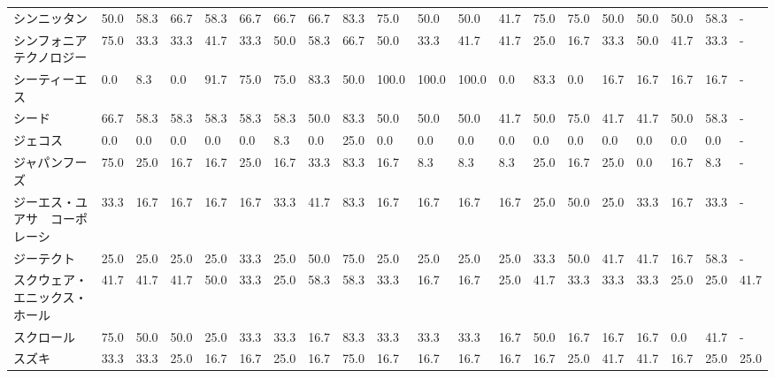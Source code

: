 \documentclass[a4paper，11pt]{jsarticle}
\begin{document}
\begin{longtable}[c]{lp{3mm}p{3mm}p{3mm}p{3mm}p{3mm}p{3mm}p{3mm}p{3mm}p{3mm}p{3mm}p{3mm}p{3mm}p{3mm}p{3mm}p{3mm}p{3mm}p{3mm}p{3mm}p{3mm}}
シンニッタン          &   50.0 &   58.3 &      66.7 &      58.3 &       66.7 &   66.7 &   66.7 &   83.3 &    75.0 &    50.0 &   50.0 &  41.7 &   75.0 &    75.0 &    50.0 &  50.0 &  50.0 &  58.3 &     - \\
シンフォニア　テクノロジー   &   75.0 &   33.3 &      33.3 &      41.7 &       33.3 &   50.0 &   58.3 &   66.7 &    50.0 &    33.3 &   41.7 &  41.7 &   25.0 &    16.7 &    33.3 &  50.0 &  41.7 &  33.3 &     - \\
シーティーエス         &    0.0 &    8.3 &       0.0 &      91.7 &       75.0 &   75.0 &   83.3 &   50.0 &   100.0 &   100.0 &  100.0 &   0.0 &   83.3 &     0.0 &    16.7 &  16.7 &  16.7 &  16.7 &     - \\
シード             &   66.7 &   58.3 &      58.3 &      58.3 &       58.3 &   58.3 &   50.0 &   83.3 &    50.0 &    50.0 &   50.0 &  41.7 &   50.0 &    75.0 &    41.7 &  41.7 &  50.0 &  58.3 &     - \\
ジェコス            &    0.0 &    0.0 &       0.0 &       0.0 &        0.0 &    8.3 &    0.0 &   25.0 &     0.0 &     0.0 &    0.0 &   0.0 &    0.0 &     0.0 &     0.0 &   0.0 &   0.0 &   0.0 &     - \\
ジャパンフーズ         &   75.0 &   25.0 &      16.7 &      16.7 &       25.0 &   16.7 &   33.3 &   83.3 &    16.7 &     8.3 &    8.3 &   8.3 &   25.0 &    16.7 &    25.0 &   0.0 &  16.7 &   8.3 &     - \\
ジーエス・ユアサ　コーポレーシ &   33.3 &   16.7 &      16.7 &      16.7 &       16.7 &   33.3 &   41.7 &   83.3 &    16.7 &    16.7 &   16.7 &  16.7 &   25.0 &    50.0 &    25.0 &  33.3 &  16.7 &  33.3 &     - \\
ジーテクト           &   25.0 &   25.0 &      25.0 &      25.0 &       33.3 &   25.0 &   50.0 &   75.0 &    25.0 &    25.0 &   25.0 &  25.0 &   33.3 &    50.0 &    41.7 &  41.7 &  16.7 &  58.3 &     - \\
スクウェア・エニックス・ホール &   41.7 &   41.7 &      41.7 &      50.0 &       33.3 &   25.0 &   58.3 &   58.3 &    33.3 &    16.7 &   16.7 &  25.0 &   41.7 &    33.3 &    33.3 &  33.3 &  25.0 &  25.0 &  41.7 \\
スクロール           &   75.0 &   50.0 &      50.0 &      25.0 &       33.3 &   33.3 &   16.7 &   83.3 &    33.3 &    33.3 &   33.3 &  16.7 &   50.0 &    16.7 &    16.7 &  16.7 &   0.0 &  41.7 &     - \\
スズキ             &   33.3 &   33.3 &      25.0 &      16.7 &       16.7 &   25.0 &   16.7 &   75.0 &    16.7 &    16.7 &   16.7 &  16.7 &   16.7 &    25.0 &    41.7 &  41.7 &  16.7 &  25.0 &  25.0 \\

\end{longtable}
\end{document}
